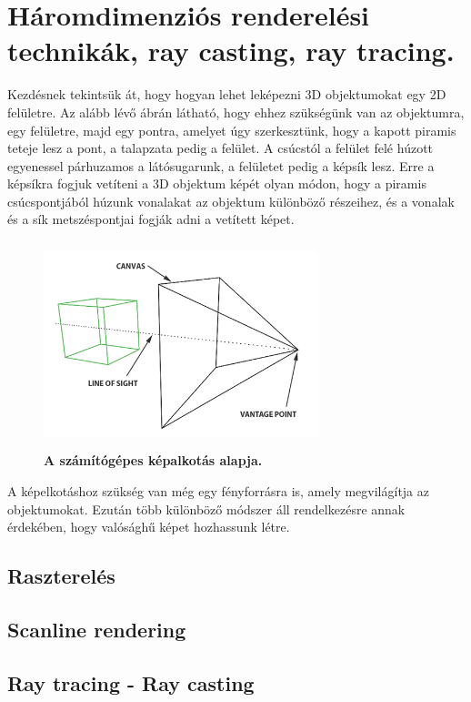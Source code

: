 \documentclass[12pt]{article}
\theoremstyle{plain}
\begin{document}
 \section{Háromdimenziós renderelési technikák, ray casting, ray tracing.}
 Kezdésnek tekintsük át, hogy hogyan lehet leképezni 3D objektumokat egy 2D felületre. Az alább lévő ábrán látható, hogy ehhez szükségünk van az objektumra, egy felületre, majd egy pontra, amelyet úgy szerkesztünk, hogy a kapott piramis teteje lesz a pont, a talapzata pedig a felület. A csúcstól a felület felé húzott egyenessel párhuzamos a látósugarunk, a felületet pedig a képsík lesz. Erre a képsíkra fogjuk vetíteni a 3D objektum képét olyan módon, hogy a piramis csúcspontjából húzunk vonalakat az objektum különböző részeihez, és a vonalak és a sík metszéspontjai fogják adni a vetített képet. 
 \begin{figure}[H]
    \centering
    \includegraphics[width=8cm, height=6cm]{media/vantagepoint.png}
    \caption{\textbf{A számítógépes képalkotás alapja.}}
    \label{fig:GeneralDiagram}
 \end{figure}
 
 A képelkotáshoz szükség van még egy fényforrásra is, amely megvilágítja az objektumokat. Ezután több különböző módszer áll rendelkezésre annak érdekében, hogy valósághű képet hozhassunk létre. 
 
 \subsection{Raszterelés}
 
 \subsection{Scanline rendering}
 
 \subsection{Ray tracing - Ray casting}
 
\end{document}
